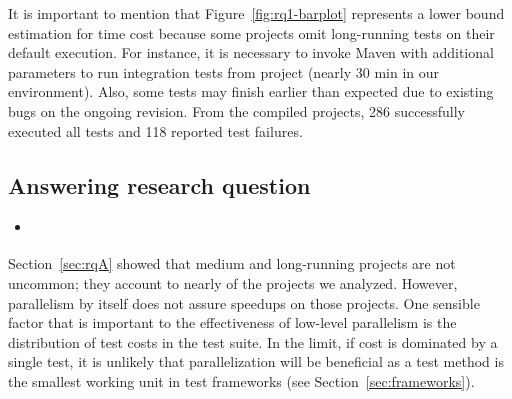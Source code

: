 It is important to mention that Figure~\ref{fig:rq1-barplot}
represents a lower bound estimation for time cost because some
projects omit long-running tests on their default execution. For
instance, it is necessary to invoke Maven with additional parameters
to run integration tests from project 
(nearly 30 min in our environment).  Also, some tests may finish
earlier than expected due to existing bugs on the ongoing revision.
From the \numSubjs{} compiled projects, 286 successfully executed
all tests and 118 reported test failures.

\begin{center}
\end{center}

\subsection{Answering research question \numRQB{}}
\label{sec:rqB}

\begin{itemize}
    \item \emph{\RQB}
\end{itemize}

Section~\ref{sec:rqA} showed that medium and long-running projects are
not uncommon; they account to nearly \percentMedLongRunning{} of the
\numSubjs{} projects we analyzed.  However, parallelism by itself does
not assure speedups on those projects.  One sensible factor that is
important to the effectiveness of low-level parallelism is the
distribution of test costs in the test suite.  In the limit, if cost
is dominated by a single test, it is unlikely that parallelization
will be beneficial as a test method is the smallest working unit in
test frameworks (see Section~\ref{sec:frameworks}).

